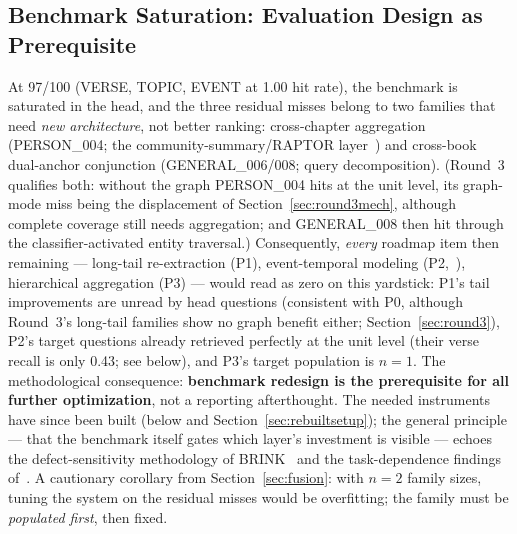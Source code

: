 \subsection{Benchmark Saturation: Evaluation Design as Prerequisite}

At 97/100 (VERSE, TOPIC, EVENT at 1.00 hit rate), the benchmark is
saturated in the head, and the three residual misses belong to two
families that need \emph{new architecture}, not better ranking:
cross-chapter aggregation (PERSON\_004; the community-summary/RAPTOR
layer~\cite{edge2024graphrag,sarthi2024raptor}) and cross-book
dual-anchor conjunction (GENERAL\_006/008; query decomposition). (Round~3
qualifies both: without the graph PERSON\_004 hits at the unit level,
its graph-mode miss being the displacement of
Section~\ref{sec:round3mech}, although complete coverage still needs
aggregation; and GENERAL\_008 then hit through the classifier-activated
entity traversal.)
Consequently, \emph{every} roadmap item then remaining --- long-tail
re-extraction (P1), event-temporal modeling
(P2,~\cite{lairgi2025atom,zhang2025entityevent,sun2025dygrag}),
hierarchical aggregation (P3) --- would read as zero on this yardstick:
P1's tail improvements are unread by head questions (consistent with
P0, although Round~3's long-tail families show no graph benefit either;
Section~\ref{sec:round3}), P2's target questions already retrieved
perfectly at the unit level (their verse recall is only 0.43; see
below), and P3's target population is $n=1$.
The methodological consequence: \textbf{benchmark redesign is the
prerequisite for all further optimization}, not a reporting
afterthought. The needed instruments have since been built (below and
Section~\ref{sec:rebuiltsetup}); the general principle --- that the benchmark
itself gates which layer's investment is visible --- echoes the
defect-sensitivity methodology of BRINK~\cite{zhou2025brink} and the
task-dependence findings of~\cite{xiang2025whengraphs}. A cautionary
corollary from Section~\ref{sec:fusion}: with $n=2$ family sizes, tuning
the system on the residual misses would be overfitting; the family must
be \emph{populated first}, then fixed.

